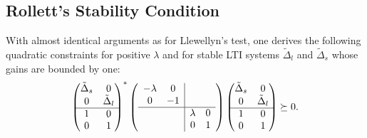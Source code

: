 \subsection{Rollett's Stability Condition}\label{sec:rollett}
With almost identical arguments as for Llewellyn's test, 
one derives the following quadratic constraints {for positive $\lambda$} and for stable LTI systems 
$\tilde{\Delta}_l$ and $\tilde{\Delta}_s$ whose gains are bounded by one:
\[
\begin{pmatrix}\tilde{\Delta}_s &0\\0 &\tilde{\Delta}_l\\\hline 1 &0\\0 &1\end{pmatrix}^*\left(\begin{array}{cc|cc}
-\lambda  &0  & 				& \\
0	  			&-1  &  				&\\ \hline
	  			& 	&\lambda 	&0\\
	  			& 	&0 				&1
	  			\end{array}\right)
\begin{pmatrix}\tilde{\Delta}_s &0\\0 &\tilde{\Delta}_l\\\hline 1 &0\\0 &1\end{pmatrix} \succeq 0.
\]

